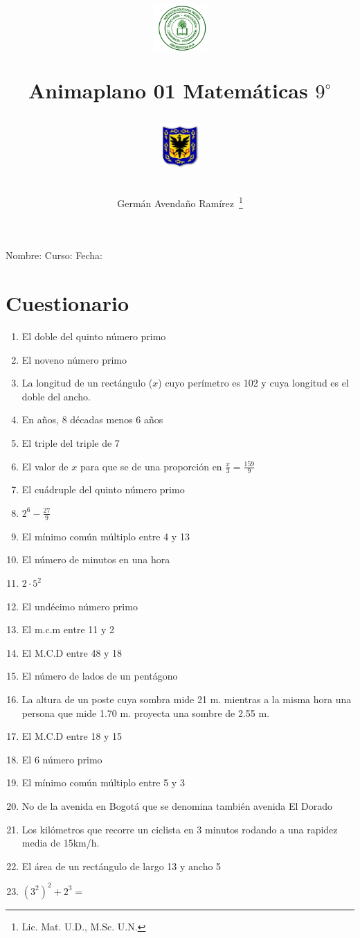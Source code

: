 \documentclass[letterpaper,11pt,twoside]{article}
\author{Germ\'an Avenda\~no Ram\'irez~\thanks{Lic. Mat. U.D., M.Sc. U.N.}}
\title{\begin{minipage}{.2\textwidth}
\includegraphics[height=1.75cm]{Images/logo-colegio.png}\end{minipage}
\begin{minipage}{.55\textwidth}
\begin{center}
Animaplano 01
Matemáticas $9^{\circ}$
\end{center}
\end{minipage}\hfill
\begin{minipage}{.2\textwidth}
\includegraphics[height=1.75cm]{Images/logo-sed.png} 
\end{minipage}}
\date{}
\begin{document}
\maketitle
Nombre: \hrulefill Curso: \underline{\hspace*{44pt}} Fecha: \underline{\hspace*{2.5cm}}
\section*{Cuestionario}
\begin{enumerate}
\item El doble del quinto n\'{u}mero primo
\item El noveno n\'{u}mero primo
\item La longitud de un rect\'{a}ngulo ($x$) cuyo per\'{i}metro es 102 y cuya longitud es el doble del ancho.
\item En años, 8 décadas menos 6 años
\item El triple del triple de 7
\item El valor de $x$ para que se de una proporci\'{o}n en $\frac{x}{3}=\frac{159}{9}$
\item El cuádruple del quinto número primo
\item $2^{6}-\frac{27}{9}$
\item El mínimo común múltiplo entre 4 y 13
\item El número de minutos en una hora
\item $2\cdot 5^{2}$
\item El undécimo número primo
\item El m.c.m entre 11 y 2
\item El M.C.D entre 48 y 18
\item El número de lados de un pentágono
\item La altura de un poste cuya sombra mide 21 m. mientras a la misma hora una persona que mide 1.70 m. proyecta una sombre de 2.55 m.
\item El M.C.D entre 18 y 15
\item El 6 número primo
\item El mínimo común múltiplo entre 5 y 3
\item No de la avenida en Bogotá que se denomina también avenida El Dorado
\item Los kilómetros que recorre un ciclista en 3 minutos rodando a una rapidez media de 15km/h.
\item El área de un rectángulo de largo 13 y ancho 5
\item $(3^{2})^{2}+2^{3}=$

\end{enumerate}
\end{document}
